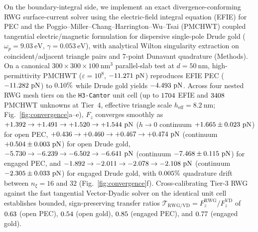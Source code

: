 \documentclass[pdflatex,sn-nature]{sn-jnl}
\begin{document}
On the boundary-integral side, we implement an exact divergence-conforming RWG surface-current solver\cite{rao1982,reid2013pra} using the electric-field integral equation (EFIE) for PEC and the Poggio--Miller--Chang--Harrington--Wu--Tsai (PMCHWT) coupled tangential electric/magnetic formulation for dispersive single-pole Drude gold ($\omega_p = 9.03\ \mathrm{eV}$, $\gamma = 0.053\ \mathrm{eV}$), with analytical Wilton singularity extraction on coincident/adjacent triangle pairs and 7-point Dunavant quadrature (Methods). On a canonical $300 \times 300 \times 100\ \mathrm{nm}^3$ parallel-slab test at $d=50\ \mathrm{nm}$, high-permittivity PMCHWT ($\varepsilon = 10^8$, $-11.271{}\ \mathrm{pN}$) reproduces EFIE PEC ($-11.282{}\ \mathrm{pN}$) to $0.10{}\%$ while Drude gold yields $-4.493{}\ \mathrm{pN}$. Across four nested RWG mesh tiers on the \texttt{H3-Cantor} unit cell (up to $1704{}$ EFIE and $3408{}$ PMCHWT unknowns at Tier~4, effective triangle scale $h_{\mathrm{eff}} = 8.2\ \mathrm{nm}$; Fig.~\ref{fig:convergence}a--e), $F_z$ converges smoothly as $+1.392{} \to +1.491{} \to +1.520{} \to +1.544{}\ \mathrm{pN}$ ($h\to 0$ continuum $+1.665{} \pm 0.023{}\ \mathrm{pN}$) for open PEC, $+0.436{} \to +0.460{} \to +0.467{} \to +0.474{}\ \mathrm{pN}$ (continuum $+0.504{} \pm 0.003{}\ \mathrm{pN}$) for open Drude gold, $-5.730{} \to -6.239{} \to -6.502{} \to -6.641{}\ \mathrm{pN}$ (continuum $-7.468{} \pm 0.115{}\ \mathrm{pN}$) for engaged PEC, and $-1.892{} \to -2.011{} \to -2.078{} \to -2.108{}\ \mathrm{pN}$ (continuum $-2.305{} \pm 0.033{}\ \mathrm{pN}$) for engaged Drude gold, with $0.005{}\%$ quadrature drift between $n_\xi=16$ and $32$ (Fig.~\ref{fig:convergence}f). Cross-calibrating Tier-3 RWG against the fast tangential Vector-Dyadic solver on the identical unit cell establishes bounded, sign-preserving transfer ratios $\mathcal{T}_{\mathrm{RWG/VD}} = F_z^{\mathrm{RWG}}/F_z^{\mathrm{VD}}$ of $0.63{}$ (open PEC), $0.54{}$ (open gold), $0.85{}$ (engaged PEC), and $0.77{}$ (engaged gold).
\end{document}
